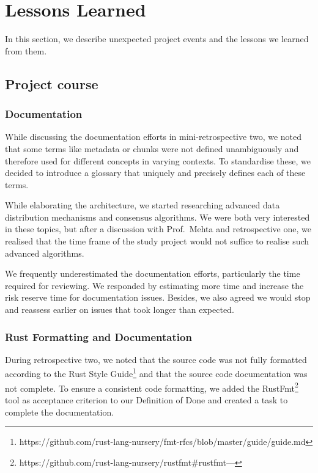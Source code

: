 \section{Lessons Learned}

In this section, we describe unexpected project events and the lessons we learned from them.

\subsection{Project course}
\subsubsection{Documentation}
While discussing the documentation efforts in mini-retrospective two, we noted that some terms like metadata or chunks were not defined unambiguously and therefore used for different concepts in varying contexts. To standardise these, we decided to introduce a glossary that uniquely and precisely defines each of these terms.

While elaborating the architecture, we started researching advanced data distribution mechanisms and consensus algorithms. We were both very interested in these topics, but after a discussion with Prof.~Mehta and retrospective one, we realised that the time frame of the study project would not suffice to realise such advanced algorithms.

We frequently underestimated the documentation efforts, particularly the time required for reviewing. We responded by estimating more time and increase the risk reserve time for documentation issues. Besides, we also agreed we would stop and reassess earlier on issues that took longer than expected.

\subsubsection{Rust Formatting and Documentation}
During retrospective two, we noted that the source code was not fully formatted according to the Rust Style Guide\footnote{https://github.com/rust-lang-nursery/fmt-rfcs/blob/master/guide/guide.md} and that the source code documentation was not complete. To ensure a consistent code formatting, we added the RustFmt\footnote{https://github.com/rust-lang-nursery/rustfmt\#rustfmt---} tool as acceptance criterion to our Definition of Done \cite{project-plan} and created a task to complete the documentation.

